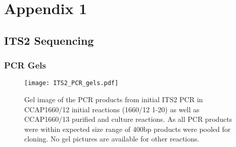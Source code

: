 \graphicspath{{appendices/appendix_1/figures/}}
\chapter{Appendix 1}

\section{ITS2 Sequencing}
\label{sec:app_its2}

\subsection{PCR Gels}
\begin{figure}[H]
    \centering
    \texttt{[image: ITS2\_PCR\_gels.pdf]}
    \caption[Gel images of ITS2 PCR from CCAP1660/12 and CCAP1660/13 reactions]{
        Gel image of the PCR products from initial ITS2 PCR in CCAP1660/12 initial reactions (1660/12 1-20) 
as well as CCAP1660/13 purified and culture reactions. As all PCR products were within expected
size range of 400bp products were pooled for cloning. No gel pictures are available for other reactions.} 
\label{fig:endo_annot}
\end{figure}

